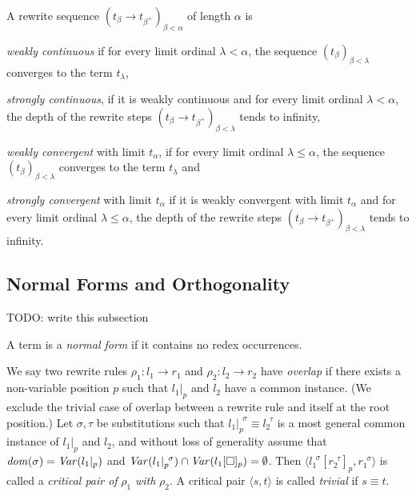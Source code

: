 \begin{definition}%
A rewrite sequence $(t_\beta \rightarrow t_{\beta^+})_{\beta < \alpha}$ of
length $\alpha$ is
\begin{compactenum}
  \item
    \emph{weakly continuous} if for every limit ordinal $\lambda < \alpha$,
    the sequence $(t_\beta)_{\beta < \lambda}$ converges to the term
    $t_\lambda$,
  \item
    \emph{strongly continuous}, if it is weakly continuous and for every limit
    ordinal $\lambda < \alpha$, the depth of the rewrite steps $(t_\beta
    \rightarrow t_{\beta^+})_{\beta < \lambda}$ tends to infinity,
  \item
    \emph{weakly convergent} with limit $t_\alpha$, if for every limit ordinal
    $\lambda \leq \alpha$, the sequence $(t_\beta)_{\beta < \lambda}$
    converges to the term $t_\lambda$ and
  \item
    \emph{strongly convergent} with limit $t_\alpha$ if it is weakly
    convergent with limit $t_\alpha$ and for every limit ordinal $\lambda \leq
    \alpha$, the depth of the rewrite steps $(t_\beta \rightarrow
    t_{\beta^+})_{\beta < \lambda}$ tends to infinity.
\end{compactenum}
\end{definition}



\subsection{Normal Forms and Orthogonality}

TODO: write this subsection

\begin{definition}%
  A term is a \emph{normal form} if it contains no redex occurrences.
\end{definition}

\begin{definition}%
We say two rewrite rules $\rho_1 : l_1 \rightarrow r_1$ and $\rho_2 :
l_2 \rightarrow r_2$ have \emph{overlap} if there exists a
non-variable position $p$ such that $l_1 |_p$ and $l_2$ have a common
instance. (We exclude the trivial case of overlap between a rewrite
rule and itself at the root position.)
Let $\sigma, \tau$ be substitutions such that $l_1 |_p ^{\,\;\sigma}
\equiv l_2 ^{\,\;\tau}$ is a most general common instance of $l_1 |_p$
and $l_2$, and without loss of generality assume that $\mathit{dom}(\sigma) =
\mathit{Var}(l_1 |_p)$ and $\mathit{Var}(l_1 |_p ^{\,\;\sigma}) \cap \mathit{Var}(l_1[\Box]_p)
= \emptyset$. Then $\langle l_1 ^{\,\;\sigma}[r_2^{\,\;\tau}]_p,
r_1^{\,\;\sigma} \rangle$ is called a \emph{critical pair of} $\rho_1$
\emph{with} $\rho_2$. A critical pair $\langle s, t \rangle$ is called
\emph{trivial} if $s \equiv t$.
\end{definition}

